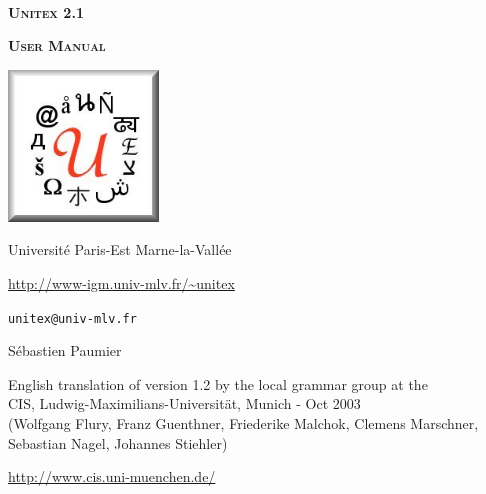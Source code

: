 
\begin{titlepage}
\begin{center}

~

\vspace{3cm}
\Huge
\textsc{\textbf{Unitex 2.1}}

\vspace{1cm}

\huge
\textsc{\textbf{User Manual}}

\vspace{2cm}

  \begin{center}
    \includegraphics[width=4cm]{resources/img/logo-Unitex.png}
  \end{center}
\normalsize

\vspace{2cm}

\LARGE

Universit\'e Paris-Est Marne-la-Vall\'ee
\bigskip
\normalsize

\url{http://www-igm.univ-mlv.fr/~unitex}

\verb$unitex@univ-mlv.fr$

\vspace{1cm}

S\'ebastien Paumier
\bigskip

English translation of version 1.2 by the local grammar group at the\\
 CIS, Ludwig-Maximilians-Universit\"at, Munich - Oct 2003\\
 (Wolfgang Flury, Franz Guenthner, Friederike Malchok, Clemens Marschner, 
 Sebastian Nagel, Johannes Stiehler)

\url{http://www.cis.uni-muenchen.de/}
\end{center}

\end{titlepage}
